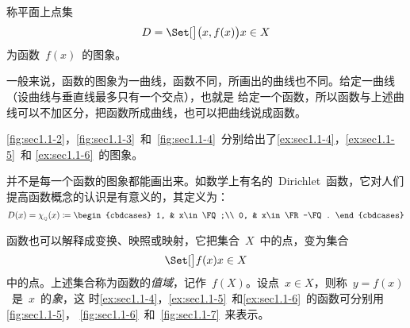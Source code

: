 \begin{definition}
称平面上点集
\[
  D=\Setb{\Parenb{x,f(x)}}{x\in X}
\]
为函数~$f(x)$~的图象。
\end{definition}

一般来说，函数的图象为一曲线，函数不同，所画出的曲线也不同。给定一曲线（设曲线与垂直线最多只有一个交点），也就是
给定一个函数，所以函数与上述曲线可以不加区分，把函数所成曲线，也可以把曲线说成函数。

\ref{fig:sec1.1-2}，\ref{fig:sec1.1-3}~和~\ref{fig:sec1.1-4}~分别给出了\ref{ex:sec1.1-4}，\ref{ex:sec1.1-5}~和%
\ref{ex:sec1.1-6}~的图象。

\begin{figure}
\begin{floatrow}[3]
\figurebox{\caption{}\label{fig:sec1.1-2}}
          {\somefigure}
\figurebox{\caption{}\label{fig:sec1.1-3}}
          {\somefigure}
\figurebox{\caption{}\label{fig:sec1.1-4}}
          {\somefigure}
\end{floatrow}
\end{figure}

并不是每一个函数的图象都能画出来。如数学上有名的~Dirichlet~函数，它对人们提高函数概念的认识是有意义的，其定义为：
\[
  D(x)=\chi_{_\FQ}(x)\coloneq\begin{cbdcases}
  1, & x\in\FQ;\\
  0, & x\in\FR-\FQ.
  \end{cbdcases}
\]

函数也可以解释成变换、映照或映射，它把集合~$X$~中的点，变为集合
\[
  \Setb{f(x)}{x\in X}
\]
中的点。上述集合称为函数的\emph{值域}，记作~$f(X)$。设点~$x\in X$，则称~$y=f(x)$~是~$x$~的\emph{象}，这
时\ref{ex:sec1.1-4}，\ref{ex:sec1.1-5}~和\ref{ex:sec1.1-6}~的函数可分别用\ref{fig:sec1.1-5}，%
\ref{fig:sec1.1-6}~和~\ref{fig:sec1.1-7}~来表示。

\begin{figure}
\begin{floatrow}[3]
\figurebox{\caption{}\label{fig:sec1.1-5}}
          {\somefigure}
\figurebox{\caption{}\label{fig:sec1.1-6}}
          {\somefigure}
\figurebox{\caption{}\label{fig:sec1.1-7}}
          {\somefigure}
\end{floatrow}
\end{figure}

